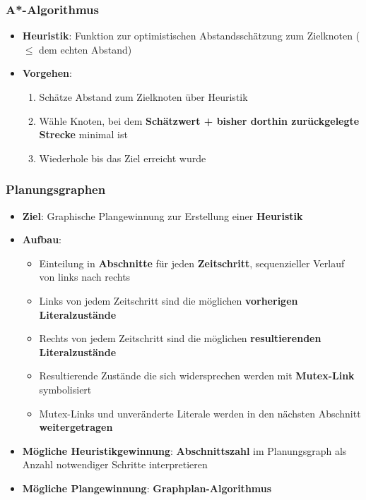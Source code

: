 \subsubsection{A*-Algorithmus}%
\label{plan:ssub:a_algorithmus}

\begin{itemize}
	\item \textbf{Heuristik}: Funktion zur optimistischen Abstandsschätzung zum Zielknoten ($\leq$ dem echten Abstand)
	\item \textbf{Vorgehen}:
	\begin{enumerate}
		\item Schätze Abstand zum Zielknoten über Heuristik
		\item Wähle Knoten, bei dem \textbf{Schätzwert + bisher dorthin zurückgelegte Strecke} minimal ist
		\item Wiederhole bis das Ziel erreicht wurde
	\end{enumerate}
\end{itemize}

\subsubsection{Planungsgraphen}%
\label{plan:ssub:planungsgraphen}

\begin{itemize}
	\item \textbf{Ziel}: Graphische Plangewinnung zur Erstellung einer \textbf{Heuristik}
	\item \textbf{Aufbau}:
	\begin{itemize}
		\item Einteilung in \textbf{Abschnitte} für jeden \textbf{Zeitschritt}, sequenzieller Verlauf von links nach rechts
		\item Links von jedem Zeitschritt sind die möglichen \textbf{vorherigen Literalzustände}
		\item Rechts von jedem Zeitschritt sind die möglichen \textbf{resultierenden Literalzustände}
		\item Resultierende Zustände die sich widersprechen werden mit \textbf{Mutex-Link} symbolisiert
		\item Mutex-Links und unveränderte Literale werden in den nächsten Abschnitt \textbf{weitergetragen}
	\end{itemize}
	\item \textbf{Mögliche Heuristikgewinnung}: \textbf{Abschnittszahl} im Planungsgraph als Anzahl notwendiger Schritte interpretieren
	\item \textbf{Mögliche Plangewinnung}: \textbf{Graphplan-Algorithmus}
\end{itemize}

